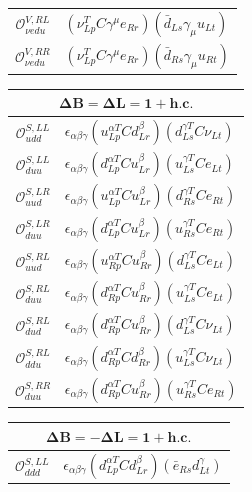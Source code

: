 \begin{table}[htbp]
{\begin{tabular}[t]{c|l}
        $\mathcal{O}_{\nu edu}^{V,RL}$ & $(\nu_{Lp}^T C \gamma^\mu e_{Rr})(\bar{d}_{Ls} \gamma_\mu u_{Lt})$ \\
        $\mathcal{O}_{\nu edu}^{V,RR}$ & $(\nu_{Lp}^T C \gamma^\mu e_{Rr})(\bar{d}_{Rs} \gamma_\mu u_{Rt})$
    \end{tabular}
    \hspace{0.3em}
    \begin{tabular}[t]{c|l}
        \multicolumn{2}{c}{\textbf{$\boldsymbol{\Delta B = \Delta L = 1 + \text{h.c.}}$}} \\ \hline
        $\mathcal{O}_{udd}^{S,LL}$ & $\epsilon_{\alpha\beta\gamma}(u_{Lp}^{\alpha T} C d_{Lr}^\beta)(d_{Ls}^{\gamma T} C \nu_{Lt})$ \\
        $\mathcal{O}_{duu}^{S,LL}$ & $\epsilon_{\alpha\beta\gamma}(d_{Lp}^{\alpha T} C u_{Lr}^\beta)(u_{Ls}^{\gamma T} C e_{Lt})$ \\
        $\mathcal{O}_{uud}^{S,LR}$ & $\epsilon_{\alpha\beta\gamma}(u_{Lp}^{\alpha T} C u_{Lr}^\beta)(d_{Rs}^{\gamma T} C e_{Rt})$ \\
        $\mathcal{O}_{duu}^{S,LR}$ & $\epsilon_{\alpha\beta\gamma}(d_{Lp}^{\alpha T} C u_{Lr}^\beta)(u_{Rs}^{\gamma T} C e_{Rt})$ \\
        $\mathcal{O}_{uud}^{S,RL}$ & $\epsilon_{\alpha\beta\gamma}(u_{Rp}^{\alpha T} C u_{Rr}^\beta)(d_{Ls}^{\gamma T} C e_{Lt})$ \\
        $\mathcal{O}_{duu}^{S,RL}$ & $\epsilon_{\alpha\beta\gamma}(d_{Rp}^{\alpha T} C u_{Rr}^\beta)(u_{Ls}^{\gamma T} C e_{Lt})$ \\
        $\mathcal{O}_{dud}^{S,RL}$ & $\epsilon_{\alpha\beta\gamma}(d_{Rp}^{\alpha T} C u_{Rr}^\beta)(d_{Ls}^{\gamma T} C \nu_{Lt})$ \\
        $\mathcal{O}_{ddu}^{S,RL}$ & $\epsilon_{\alpha\beta\gamma}(d_{Rp}^{\alpha T} C d_{Rr}^\beta)(u_{Ls}^{\gamma T} C \nu_{Lt})$ \\
        $\mathcal{O}_{duu}^{S,RR}$ & $\epsilon_{\alpha\beta\gamma}(d_{Rp}^{\alpha T} C u_{Rr}^\beta)(u_{Rs}^{\gamma T} C e_{Rt})$
    \end{tabular}
    \hspace{0.3em}
    \begin{tabular}[t]{c|l}
        \multicolumn{2}{c}{\textbf{$\boldsymbol{\Delta B = -\Delta L = 1 + \text{h.c.}}$}} \\ \hline
        $\mathcal{O}_{ddd}^{S,LL}$ & $\epsilon_{\alpha\beta\gamma}(d_{Lp}^{\alpha T} C d_{Lr}^\beta)(\bar{e}_{Rs} d_{Lt}^\gamma)$ \\

\end{tabular}}
\end{table}

